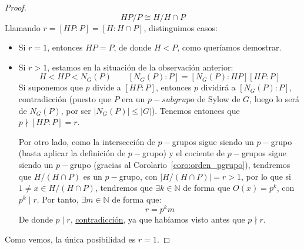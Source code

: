 \begin{lema}
\begin{proof}
\begin{equation*}
            HP/P \cong H/H\cap P
        \end{equation*}
        Llamando $r = [HP:P] = [H:H\cap P]$, distinguimos casos:
        \begin{itemize}
            \item Si $r = 1$, entonces $HP = P$, de donde $H < P$, como queríamos demostrar.
            \item Si $r > 1$, estamos en la situación de la observación anterior: 
                \begin{equation*}
                    H < HP < N_G(P) \qquad [N_G(P) : P] = [N_G(P) : HP] [HP : P]
                \end{equation*}
                Si suponemos que $p$ divide a $[HP:P]$, entonces $p$ dividirá a $[N_G(P):P]$, contradicción (puesto que $P$ era un $p-subgrupo$ de Sylow de $G$, luego lo será de $N_G(P)$, por ser $|N_G(P)| \leq |G|$). Tenemos entonces que $p\nmid [HP:P] = r$.

                Por otro lado, como la intersección de $p-$grupos sigue siendo un $p-$grupo (basta aplicar la definición de $p-$grupo) y el cociente de $p-$grupos sigue siendo un $p-$grupo (gracias al Corolario~\ref{coro:orden_pgrupo}), tendremos que $H/(H\cap P)$ es un $p-$grupo, con $|H/(H\cap P)| = r > 1$, por lo que si $1\neq x \in H/(H\cap P)$, tendremos que $\exists k\in \mathbb{N}$ de forma que $O(x) = p^k$, con $p^k \mid r$. Por tanto, $\exists m\in \mathbb{N}$ de forma que:
                \begin{equation*}
                    r =  p^k m
                \end{equation*}
                De donde $p \mid r$, \underline{contradicción}, ya que habíamos visto antes que $p\nmid r$.
        \end{itemize}
        Como vemos, la única posibilidad es $r = 1$.
    \end{proof}
\end{lema}

